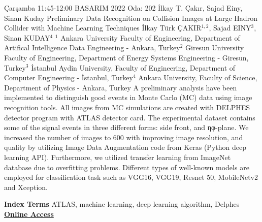 
    \begin{abstract_basarim}
    {Çarşamba 11:45-12:00}
    {BASARIM 2022}
    {Oda: 202}
    {İlkay T. Çakır, Sajad Einy, Sinan Kuday}
    {Preliminary Data Recognition on Collision Images at Large Hadron Collider with Machine Learning Techniques}
    {%
    İlkay Türk ÇAKIR$^{1,2}$, Sajad EINY$^{3}$, Sinan KUDAY$^{4}$}
    {%
    }
    {%
    $^1$ Ankara University Faculty of Engineering, Department of Artifical Intelligence Data Engineering - Ankara, Turkey\newline{}$^2$ Giresun University Faculty of Engineering, Department of Energy Systems Engineering - Giresun, Turkey\newline{}$^3$ İstanbul Aydin University, Faculty of Engineering, Department of Computer Engineering - İstanbul, Turkey\newline{}$^4$ Ankara University, Faculty of Science, Department of Physics - Ankara, Turkey}
    A preliminary analysis have been implemented to distinguish good events in Monte Carlo (MC) data using image recognition tools. All images from MC simulations are created with DELPHES detector program with ATLAS detector card. The experimental dataset contains some of the signal events in three different forms: side front, and ηφ-plane. We increased the number of images to 600 with improving image resolution, and quality by utilizing Image Data Augmentation code from Keras (Python deep learning API). Furthermore, we utilized transfer learning from ImageNet database due to overfitting problems. Different types of well-known models are employed for classification task such as VGG16, VGG19, Resnet 50, MobileNetv2 and Xception.  
    
            \textbf{Index Terms} \newline{}ATLAS, machine learning, deep learning algorithm, Delphes
     \newline\newline\noindent \href{https://drive.google.com/file/d/14flKburhp0hlb0DXA2fsXt4KPQl-p0rI/view?usp=drivesdk}{\bfseries Online Access}
    \end{abstract_basarim}
    
